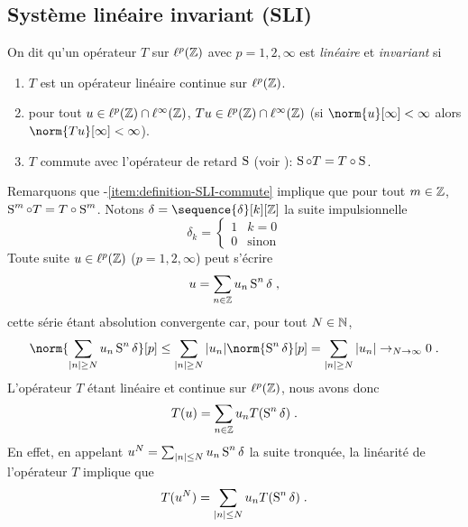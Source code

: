 \subsection{Système linéaire invariant  (SLI)}
\begin{definition}
\label{def:definition-SLI}
On dit qu'un opérateur $T$ sur $\ell^p(\mathbb{Z})$ avec $p=1,2,\infty$ est \emph{linéaire} et \emph{invariant} si
\begin{enumerate}[label=(\roman*)]
\item \label{item:definition-SLI-continu} $T$ est un opérateur linéaire continue sur $\ell^p(\mathbb{Z})$.
\item \label{item:defintion-SLI-borne} pour tout $u \in \ell^p(\mathbb{Z}) \cap \ell^\infty(\mathbb{Z})$,  $Tu \in \ell^p(\mathbb{Z}) \cap \ell^\infty(\mathbb{Z})$ (si $\norm{u}[\infty] < \infty$ alors $\norm{Tu}[\infty] < \infty$).
\item \label{item:definition-SLI-commute} $T$ commute avec l'opérateur de retard $\operatorname{S}$ (voir ): $\operatorname{S} \circ T= T \circ \operatorname{S}$.
\end{enumerate}
\end{definition}
Remarquons que -\ref{item:definition-SLI-commute} implique que pour tout $m \in \mathbb{Z}$, $\operatorname{S}^m \circ T= T \circ \operatorname{S}^m$.
Notons $\delta= \sequence{\delta}[k][\zset]$ la suite impulsionnelle
\begin{equation}
\label{eq:definition-impulsion}
\delta_k = \begin{cases} 1 & k = 0 \\ 0 & \text{sinon} \end{cases}
\end{equation}
Toute suite $u \in \ell^p(\mathbb{Z})$ ($p=1,2,\infty$) peut s'écrire
\begin{equation}
\label{eq:decomposition-u}
u = \sum_{n \in \mathbb{Z}} u_n \operatorname{S}^n \delta \;,
\end{equation}
cette série étant absolution convergente car, pour tout $N \in \mathbb{N}$,
\[
\norm{\sum_{|n|\geq N} u_n \retard^n \delta}[p] \leq \sum_{|n|\geq N} |u_n| \norm{\retard^n \delta}[p] = \sum_{|n| \geq N} |u_n| \to_{N \to \infty} 0 \eqsp.
\]
L'opérateur $T$ étant linéaire et continue sur $\ell^p(\mathbb{Z})$, nous avons donc
\begin{equation}
\label{eq:action-operateur}
T(u)= \sum_{n \in \mathbb{Z}} u_n T(\operatorname{S}^n \delta) \;.
\end{equation}
En effet, en appelant $u^N= \sum_{|n|\leq N} u_n \operatorname{S}^n \delta$ la suite tronquée, la linéarité de l'opérateur $T$ implique que
\[
T(u^N)= \sum_{|n|\leq N} u_n T(\operatorname{S}^n \delta) \;.
\]
